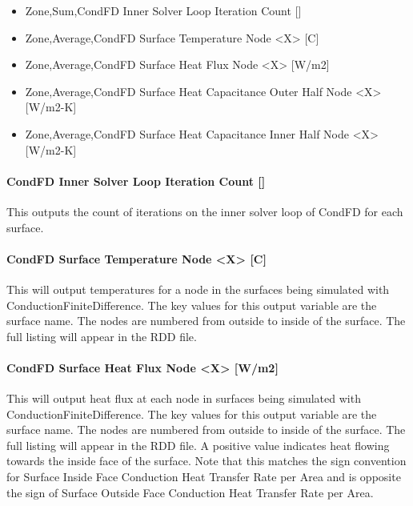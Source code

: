 \begin{itemize}
\item
  Zone,Sum,CondFD Inner Solver Loop Iteration Count {[]}
\item
  Zone,Average,CondFD Surface Temperature Node \textless{}X\textgreater{} {[}C{]}
\item
  Zone,Average,CondFD Surface Heat Flux Node \textless{}X\textgreater{} {[}W/m2{]}
\item
  Zone,Average,CondFD Surface Heat Capacitance Outer Half Node \textless{}X\textgreater{} {[}W/m2-K{]}
\item
  Zone,Average,CondFD Surface Heat Capacitance Inner Half Node \textless{}X\textgreater{} {[}W/m2-K{]}
\end{itemize}

\paragraph{CondFD Inner Solver Loop Iteration Count {[]}}\label{condfd-inner-solver-loop-iteration-count}

This outputs the count of iterations on the inner solver loop of CondFD for each surface.

\paragraph{CondFD Surface Temperature Node \textless{}X\textgreater{} {[}C{]}}\label{condfd-surface-temperature-node-x-c}

This will output temperatures for a node in the surfaces being simulated with ConductionFiniteDifference. The key values for this output variable are the surface name. The nodes are numbered from outside to inside of the surface. The full listing will appear in the RDD file.

\paragraph{CondFD Surface Heat Flux Node \textless{}X\textgreater{} {[}W/m2{]}}\label{condfd-surface-heat-flux-node-x-wm2}

This will output heat flux at each node in surfaces being simulated with ConductionFiniteDifference. The key values for this output variable are the surface name. The nodes are numbered from outside to inside of the surface. The full listing will appear in the RDD file. A positive value indicates heat flowing towards the inside face of the surface. Note that this matches the sign convention for Surface Inside Face Conduction Heat Transfer Rate per Area and is opposite the sign of Surface Outside Face Conduction Heat Transfer Rate per Area.

